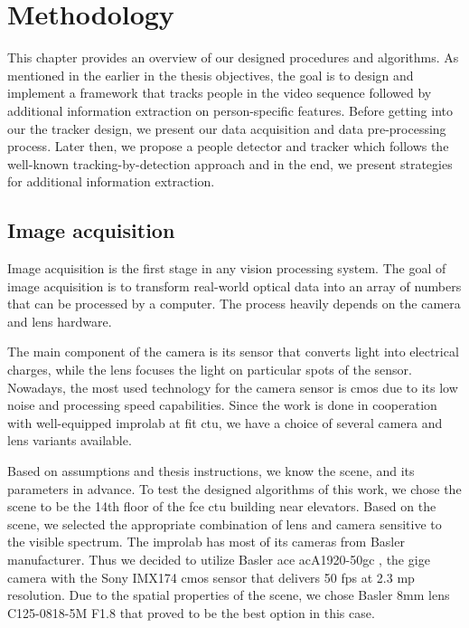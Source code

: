 \chapter{Methodology}\label{methodology}
    This chapter provides an overview of our designed procedures and algorithms. As mentioned in the earlier in the thesis objectives, the goal is to design and implement a framework that tracks people in the video sequence followed by additional information extraction on person-specific features. Before getting into our the tracker design, we present our data acquisition and data pre-processing process. Later then, we propose a people detector and tracker which follows the well-known tracking-by-detection approach and in the end, we present strategies for additional information extraction. 

\section{Image acquisition}
    Image acquisition is the first stage in any vision processing system. The goal of image acquisition is to transform real-world optical data into an array of numbers that can be processed by a computer. The process heavily depends on the camera and lens hardware. 
    
    The main component of the camera is its sensor that converts light into electrical charges, while the lens focuses the light on particular spots of the sensor. Nowadays, the most used technology for the camera sensor is \gls{cmos} due to its low noise and processing speed capabilities. Since the work is done in cooperation with well-equipped \gls{improlab} at \gls{fit} \gls{ctu}, we have a choice of several camera and lens variants available.
    
    Based on assumptions and thesis instructions, we know the scene, and its parameters in advance. To test the designed algorithms of this work, we chose the scene to be the 14th floor of the \gls{fce} \gls{ctu} building near elevators. Based on the scene, we selected the appropriate combination of lens and camera sensitive to the visible spectrum. The \gls{improlab} has most of its cameras from Basler manufacturer. Thus we decided to utilize Basler ace acA1920-50gc \cite{baslercamera}, the \gls{gige} camera with the Sony IMX174 \gls{cmos} sensor that delivers 50 \gls{fps} at 2.3 \gls{mp} resolution. Due to the spatial properties of the scene, we chose Basler 8mm lens C125-0818-5M F1.8 \cite{baslerlens} that proved to be the best option in this case.
   
